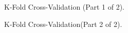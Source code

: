 \begin{figure}[H]
	\centering
	\caption{K-Fold Cross-Validation (Part 1 of 2).}
	\label{fig:o2_1}
\end{figure}
\begin{figure}[H]
	\centering
	\caption{K-Fold Cross-Validation(Part 2 of 2).}
	\label{fig:o2_2}
\end{figure}
